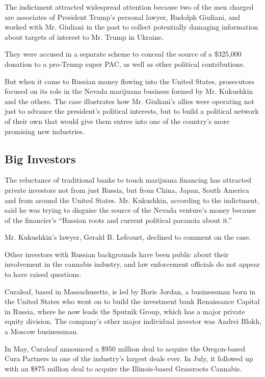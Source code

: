 The indictment attracted widespread attention because two of the men
charged are associates of President Trump's personal lawyer, Rudolph
Giuliani, and worked with Mr. Giuliani in the past to collect
potentially damaging information about targets of interest to Mr. Trump
in Ukraine.

They were accused in a separate scheme to conceal the source of a
\$325,000 donation to a pro-Trump super PAC, as well as other political
contributions.

But when it came to Russian money flowing into the United States,
prosecutors focused on its role in the Nevada marijuana business formed
by Mr. Kukushkin and the others. The case illustrates how Mr. Giuliani's
allies were operating not just to advance the president's political
interests, but to build a political network of their own that would give
them entree into one of the country's more promising new industries.

\hypertarget{big-investors}{%
\subsection{Big Investors}\label{big-investors}}

The reluctance of traditional banks to touch marijuana financing has
attracted private investors not from just Russia, but from China, Japan,
South America and from around the United States. Mr. Kukushkin,
according to the indictment, said he was trying to disguise the source
of the Nevada venture's money because of the financier's ``Russian roots
and current political paranoia about it.''

Mr. Kukushkin's lawyer, Gerald B. Lefcourt, declined to comment on the
case.

Other investors with Russian backgrounds have been public about their
involvement in the cannabis industry, and law enforcement officials do
not appear to have raised questions.

Curaleaf, based in Massachusetts, is led by Boris Jordan, a businessman
born in the United States who went on to build the investment bank
Renaissance Capital in Russia, where he now leads the Sputnik Group,
which has a major private equity division. The company's other major
individual investor was Andrei Blokh, a Moscow businessman.

In May, Curaleaf announced a \$950 million deal to acquire the
Oregon-based Cura Partners in one of the industry's largest deals ever.
In July, it followed up with an \$875 million deal to acquire the
Illinois-based Grassroots Cannabis.

